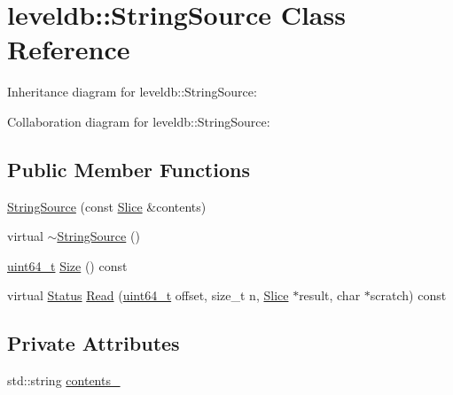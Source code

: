 \hypertarget{classleveldb_1_1_string_source}{\section{leveldb\-:\-:String\-Source Class Reference}
\label{classleveldb_1_1_string_source}
}


Inheritance diagram for leveldb\-:\-:String\-Source\-:


Collaboration diagram for leveldb\-:\-:String\-Source\-:
\subsection*{Public Member Functions}
\begin{DoxyCompactItemize}
\item 
\hyperlink{classleveldb_1_1_string_source_a4f85ccda6f37775d790834de05284fda}{String\-Source} (const \hyperlink{classleveldb_1_1_slice}{Slice} \&contents)
\item 
virtual \hyperlink{classleveldb_1_1_string_source_a0d468686fe633d0cbb04ec58be474cc8}{$\sim$\-String\-Source} ()
\item 
\hyperlink{stdint_8h_aaa5d1cd013383c889537491c3cfd9aad}{uint64\-\_\-t} \hyperlink{classleveldb_1_1_string_source_af31de6d789ba2427c98673fd1eae0778}{Size} () const 
\item 
virtual \hyperlink{classleveldb_1_1_status}{Status} \hyperlink{classleveldb_1_1_string_source_a7cf8d6ee4cd01cf514ce68326e6ec3c2}{Read} (\hyperlink{stdint_8h_aaa5d1cd013383c889537491c3cfd9aad}{uint64\-\_\-t} offset, size\-\_\-t n, \hyperlink{classleveldb_1_1_slice}{Slice} $\ast$result, char $\ast$scratch) const 
\end{DoxyCompactItemize}
\subsection*{Private Attributes}
\begin{DoxyCompactItemize}
\item 
std\-::string \hyperlink{classleveldb_1_1_string_source_afd2a04d238d79fbe4087b30f8d9b4675}{contents\-\_\-}
\end{DoxyCompactItemize}


